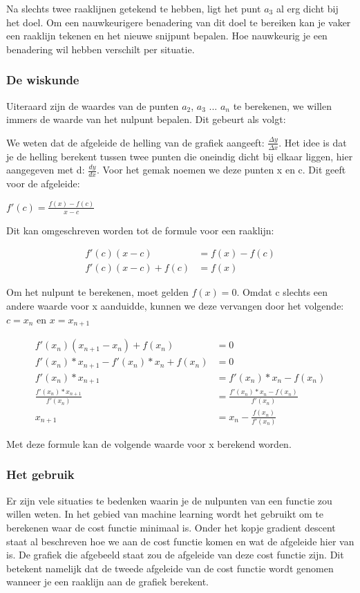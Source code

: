 Na slechts twee raaklijnen getekend te hebben, ligt het punt $ a_3 $ al erg dicht bij het doel. Om een nauwkeurigere benadering van dit doel te bereiken kan je vaker een raaklijn tekenen en het nieuwe snijpunt bepalen. Hoe nauwkeurig je een benadering wil hebben verschilt per situatie.

\subsubsection{De wiskunde}
Uiteraard zijn de waardes van de punten $ a_2 $, $ a_3 $ ... $ a_n $ te berekenen, we willen immers de waarde van het nulpunt bepalen. Dit gebeurt als volgt:

We weten dat de afgeleide de helling van de grafiek aangeeft: $ \frac{\Delta y}{\Delta x} $. Het idee is dat je de helling berekent tussen twee punten die oneindig dicht bij elkaar liggen, hier aangegeven met d: $ \frac{dy}{dx} $. Voor het gemak noemen we deze punten x en c. Dit geeft voor de afgeleide:

\begin{center}
$ f'(c) = \frac{f(x) - f(c)}{x - c}$
\end{center}

Dit kan omgeschreven worden tot de formule voor een raaklijn:

\begin{align*}
	   f'(c)(x - c) &= f(x) - f(c) \\
f'(c)(x - c) + f(c) &= f(x)
\end{align*}

Om het nulpunt te berekenen, moet gelden $ f(x) = 0 $. Omdat c slechts een andere waarde voor x aanduidde, kunnen we deze vervangen door het volgende: $ c = x_n $ en $ x = x_{n+1} $

\begin{align*}
			 f'(x_n)(x_{n+1} - x_n) + f(x_n) &= 0 \\
	f'(x_n)* x_{n+1} - f'(x_n) * x_n + f(x_n)&= 0 \\
							f'(x_n)* x_{n+1} &= f'(x_n) * x_n - f(x_n) \\
		   \frac{f'(x_n) * x_{n+1}}{f'(x_n)} &= \frac{f'(x_n) * x _n - f(x_n)}{f'(x_n)} \\
									  x_{n+1}&= x_n - \frac{f(x_n)}{f'(x_n)}
\end{align*}

Met deze formule kan de volgende waarde voor x berekend worden.

\subsubsection{Het gebruik}
Er zijn vele situaties te bedenken waarin je de nulpunten van een functie zou willen weten. In het gebied van machine learning wordt het gebruikt om te berekenen waar de cost functie minimaal is. Onder het kopje gradient descent staat al beschreven hoe we aan de cost functie komen en wat de afgeleide hier van is. De grafiek die afgebeeld staat zou de afgeleide van deze cost functie zijn. Dit betekent namelijk dat de tweede afgeleide van de cost functie wordt genomen wanneer je een raaklijn aan de grafiek berekent.

